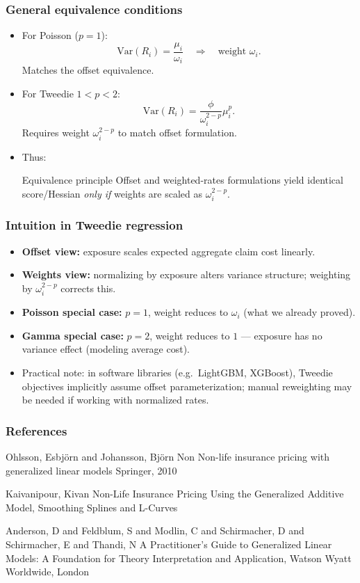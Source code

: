 \documentclass[10pt,aspectratio=169,xcolor={dvipsnames},usepdftitle=false]{beamer}
\begin{document}
\begin{frame}
\frametitle{General equivalence conditions}
\small
\begin{itemize}
\item For Poisson ($p=1$):
  \[
  \mathrm{Var}(R_i) = \frac{\mu_i}{\omega_i} \quad \Rightarrow \quad \text{weight } \omega_i.
  \]
  Matches the offset equivalence.
\item For Tweedie $1<p<2$:
  \[
  \mathrm{Var}(R_i) = \frac{\phi}{\omega_i^{2-p}} \mu_i^p.
  \]
  Requires weight $\omega_i^{2-p}$ to match offset formulation.
\item Thus:
  \begin{block}{Equivalence principle}
  Offset and weighted-rates formulations yield identical score/Hessian \emph{only if} weights are scaled as $\omega_i^{2-p}$.
  \end{block}
\end{itemize}
\end{frame}


\begin{frame}
\frametitle{Intuition in Tweedie regression}
\small
\begin{itemize}
\item \textbf{Offset view:} exposure scales expected aggregate claim cost linearly.
\item \textbf{Weights view:} normalizing by exposure alters variance structure; weighting by $\omega_i^{2-p}$ corrects this.
\item \textbf{Poisson special case:} $p=1$, weight reduces to $\omega_i$ (what we already proved).
\item \textbf{Gamma special case:} $p=2$, weight reduces to $1$ — exposure has no variance effect (modeling average cost).
\item Practical note: in software libraries (e.g.\ LightGBM, XGBoost), Tweedie objectives implicitly assume offset parameterization; manual reweighting may be needed if working with normalized rates.
\end{itemize}
\end{frame}

\begin{frame}
\frametitle{References}
	\begin{thebibliography}{10}

	\beamertemplatebookbibitems
	Ohlsson, Esbjörn and Johansson, Björn
	\newblock Non Non-life insurance pricing with generalized linear models
	\newblock Springer, 2010

	\beamertemplatearticlebibitems
	Kaivanipour, Kivan
	\newblock Non-Life Insurance Pricing Using the Generalized Additive Model, Smoothing Splines and L-Curves

	\beamertemplatearticlebibitems
	Anderson, D and Feldblum, S and Modlin, C and Schirmacher, D and Schirmacher, E and Thandi, N
	\newblock A Practitioner's Guide to Generalized Linear Models: A Foundation for Theory
    \newblock Interpretation and Application, Watson Wyatt Worldwide, London


  \end{thebibliography}
\end{frame}

\lastslide
\end{document}
